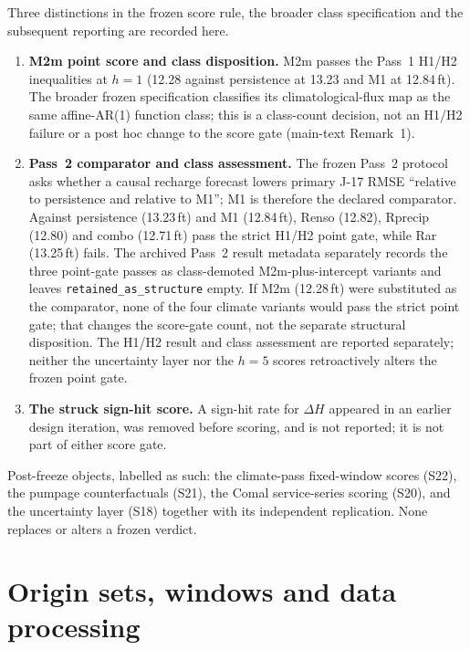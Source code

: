 Three distinctions in the frozen score rule, the broader class specification and the subsequent reporting are recorded here.
\begin{enumerate}[leftmargin=2em]
\item \textbf{M2m point score and class disposition.} M2m passes the Pass~1 H1/H2 inequalities at $h=1$ (12.28 against persistence at 13.23 and M1 at 12.84\,ft). The broader frozen specification classifies its climatological-flux map as the same affine-AR(1) function class; this is a class-count decision, not an H1/H2 failure or a post hoc change to the score gate (main-text Remark~1).
\item \textbf{Pass~2 comparator and class assessment.} The frozen Pass~2 protocol asks whether a causal recharge forecast lowers primary J-17 RMSE ``relative to persistence and relative to M1''; M1 is therefore the declared comparator. Against persistence (13.23\,ft) and M1 (12.84\,ft), Renso (12.82), Rprecip (12.80) and combo (12.71\,ft) pass the strict H1/H2 point gate, while Rar (13.25\,ft) fails. The archived Pass~2 result metadata separately records the three point-gate passes as class-demoted M2m-plus-intercept variants and leaves \texttt{retained\_as\_structure} empty. If M2m (12.28\,ft) were substituted as the comparator, none of the four climate variants would pass the strict point gate; that changes the score-gate count, not the separate structural disposition. The H1/H2 result and class assessment are reported separately; neither the uncertainty layer nor the $h=5$ scores retroactively alters the frozen point gate.
\item \textbf{The struck sign-hit score.} A sign-hit rate for $\Delta H$ appeared in an earlier design iteration, was removed before scoring, and is not reported; it is not part of either score gate.
\end{enumerate}

Post-freeze objects, labelled as such: the climate-pass fixed-window scores (S22), the pumpage counterfactuals (S21), the Comal service-series scoring (S20), and the uncertainty layer (S18) together with its independent replication. None replaces or alters a frozen verdict.

\section{Origin sets, windows and data processing}\label{si:edworigins}

